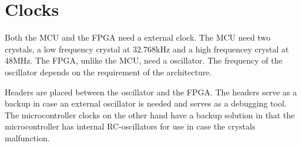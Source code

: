 \documentclass[../main/report.tex]{subfiles}
\begin{document}
\section{Clocks}
Both the MCU and the FPGA need a external clock.
The MCU need two crystals, a low frequency crystal at 32.768kHz and a high frequencey crystal at 48MHz. 
The FPGA, unlike the MCU, need a oscillator. The frequency of the oscillator depends on the requirement of the architecture.

Headers are placed between the oscillator and the FPGA. 
The headers serve as a backup in case an external oscillator is needed and serves as a debugging tool.
The microcontroller clocks on the other hand have a backup solution in that the microcontroller has internal RC-oscillators for use in case the crystals malfunction.
\end{document}
